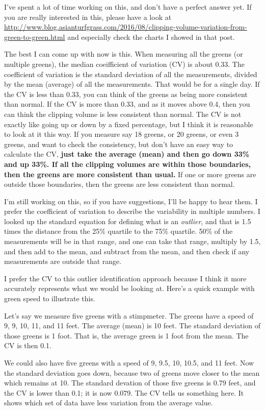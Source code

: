 \documentclass[12pt,b5,]{tufte-book}
\begin{document}
I've spent a lot of time working on this, and don't have a perfect
answer yet. If you are really interested in this, please have a look at
\url{http://www.blog.asianturfgrass.com/2016/08/clipping-volume-variation-from-green-to-green.html}
and especially check the charts I showed in that post.

The best I can come up with now is this. When measuring all the greens
(or multiple greens), the median coeifficient of variation (CV) is about
0.33. The coefficient of variation is the standard deviation of all the
measurements, divided by the mean (average) of all the measurements.
That would be for a single day. If the CV is less than 0.33, you can
think of the greens as being more consistent than normal. If the CV is
more than 0.33, and as it moves above 0.4, then you can think the
clipping volume is less consistent than normal. The CV is not exactly
like going up or down by a fixed percentage, but I think it is
reasonable to look at it this way. If you measure say 18 greens, or 20
greens, or even 3 greens, and want to check the consistency, but don't
have an easy way to calculate the CV, \textbf{just take the average (mean) and
then go down 33\% and up 33\%. If all the clipping volumes are within
those boundaries, then the greens are more consistent than usual.} If
one or more greens are outside those boundaries, then the greens are
less consistent than normal.

I'm still working on this, so if you have suggestions, I'll be happy to
hear them. I prefer the coefficient of variation to describe the
variability in multiple numbers. I looked up the standard equation for
defining what is an \emph{outlier}, and that is 1.5 times the distance from
the 25\% quartile to the 75\% quartile. 50\% of the measurements will be in
that range, and one can take that range, multiply by 1.5, and then add
to the mean, and subtract from the mean, and then check if any
measurements are outside that range.

I prefer the CV to this outlier identification approach because I think
it more accurately represents what we would be looking at. Here's a
quick example with green speed to illustrate this.

Let's say we measure five greens with a stimpmeter. The greens have a
speed of 9, 9, 10, 11, and 11 feet. The average (mean) is 10 feet. The
standard deviation of those greens is 1 foot. That is, the average green
is 1 foot from the mean. The CV is then 0.1.

We could also have five greens with a speed of 9, 9.5, 10, 10.5, and 11
feet. Now the standard deviation goes down, because two of greens move
closer to the mean which remains at 10. The standard devation of those
five greens is 0.79 feet, and the CV is lower than 0.1; it is now 0.079.
The CV tells us something here. It shows which set of data have less
variation from the average value.
\end{document}
